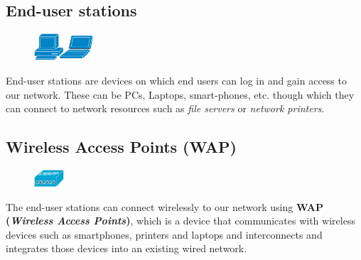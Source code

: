 \subsection{End-user stations}
\begin{figure}
	\centering
	\vspace{-10pt}
	\includegraphics[width=0.2\textwidth]{"Mod1/chapters/1.2.b Network Icons/1.2.b.3 End-user stations"}
	\vspace{-20pt}
\end{figure}
End-user stations are devices on which end users can log in and gain access to our network. These can be PCs, Laptops, smart-phones, etc. though which they can connect to network resources such as \textit{file servers} or \textit{network printers}. 

\subsection{Wireless Access Points (WAP)}
\begin{figure}
	\centering
	\vspace{-10pt}
	\includegraphics[width=0.1\textwidth]{"Mod1/chapters/1.2.b Network Icons/1.2.b.4 WAP"}
	\vspace{-10pt}
\end{figure}
The end-user stations can connect wirelessly to our network using \textbf{WAP (\textit{Wireless Access Points})}, which is a device that communicates with wireless devices such as smartphones, printers and laptops and interconnects and integrates those devices into an existing wired network.  

